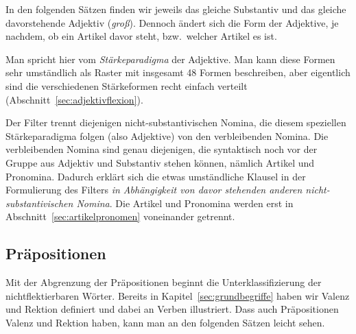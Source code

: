 \label{sec:adjektivewortklassen}

In den folgenden Sätzen finden wir jeweils das gleiche Substantiv und das gleiche davorstehende Adjektiv (\textit{groß}).
Dennoch ändert sich die Form der Adjektive, je nachdem, ob ein Artikel davor steht, bzw.\ welcher Artikel es ist.

\begin{exe}
  \ex
  \begin{xlist}
  \end{xlist}
  \ex
  \begin{xlist}
  \end{xlist}
\end{exe}

Man spricht hier vom \textit{Stärkeparadigma} der Adjektive.
Man kann diese Formen sehr umständlich als Raster mit insgesamt 48 Formen beschreiben, aber eigentlich sind die verschiedenen Stärkeformen recht einfach verteilt (Abschnitt~\ref{sec:adjektivflexion}).

Der Filter trennt diejenigen nicht-substantivischen Nomina, die diesem speziellen Stärkeparadigma folgen (also Adjektive) von den verbleibenden Nomina.
Die verbleibenden Nomina sind genau diejenigen, die syntaktisch noch vor der Gruppe aus Adjektiv und Substantiv stehen können, nämlich Artikel und Pronomina.
Dadurch erklärt sich die etwas umständliche Klausel in der Formulierung des Filters \textit{in Abhängigkeit von davor stehenden anderen nicht-substantivischen Nomina}.
Die Artikel und Pronomina werden erst in Abschnitt~\ref{sec:artikelpronomen} voneinander getrennt.


\subsection{Präpositionen}

\label{sec:praepositionenwortklassen}


Mit der Abgrenzung der Präpositionen beginnt die Unterklassifizierung der nichtflektierbaren Wörter. 
Bereits in Kapitel~\ref{sec:grundbegriffe} haben wir Valenz und Rektion definiert und dabei an Verben illustriert.
Dass auch Präpositionen Valenz und Rektion haben, kann man an den folgenden Sätzen leicht sehen.

